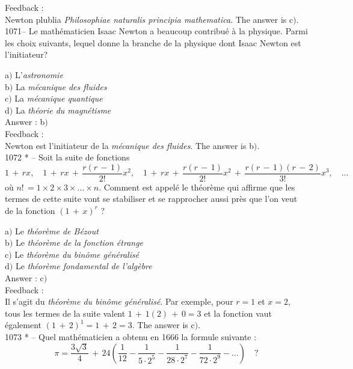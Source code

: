 \documentclass[letterpaper, 12pt]{article}
\begin{document}
Feedback : \\
Newton plublia {\sl Philosophiae naturalis principia mathematica}.
The answer is c$)$.\\

1071-- Le math\'ematicien Isaac Newton a beaucoup contribu\'e \`a la
physique. Parmi les choix suivants, lequel donne la branche de la
physique dont Isaac Newton est l'initiateur?

a$)$ L'{\sl astronomie} \\
b$)$ La {\sl m\'ecanique des fluides}  \\
c$)$ La {\sl m\'ecanique quantique}  \\
d$)$ La {\sl th\'eorie du magn\'etisme}\\

Answer : b$)$\\

Feedback : \\
Newton est l'initiateur de la {\sl m\'ecanique des fluides}.
The answer is b$)$.\\

1072 * -- Soit la suite de fonctions
$$\displaystyle{1\,+\,rx,\quad 1\,+\,rx\,+\,\frac{r(r\,-\,1)}{2!}x^2,\quad
1\,+\,rx\,+\,\frac{r(r\,-\,1)}{2!}x^2\,+\,\frac{r(r\,-\,1)(r\,-\,2)}{3!}x^3,\quad
\ldots}$$
o\`u $n!\,=1\times2\times3\times\ldots\times n$. Comment est
appel\'e le th\'eor\`eme qui affirme que les termes de cette suite
vont se stabiliser et se rapprocher aussi pr\`es que l'on veut de la
fonction $(1\,+\,x)^r$ ?

a$)$ Le {\sl th\'eor\`eme de B\'ezout} \\
b$)$ Le {\sl th\'eor\`eme de la fonction \'etrange}  \\
c$)$ Le {\sl th\'eor\`eme du bin\^ome g\'en\'eralis\'e}  \\
d$)$ Le {\sl th\'eor\`eme fondamental de l'alg\`ebre}\\

Answer : c$)$\\

Feedback : \\
Il s'agit du {\sl th\'eor\`eme du bin\^ome g\'en\'eralis\'e}. Par
exemple, pour $r=1$ et $x=2$, tous les termes de la suite valent
$1\,+\,1(2)\,+\,0=3$ et la fonction vaut \'egalement
$(1\,+\,2)^1=1\,+\,2=3$.
The answer is c$)$.\\

1073 * -- Quel math\'ematicien a obtenu en 1666 la formule suivante
:
$$\displaystyle{\pi=\frac{3\sqrt3}4\,+\,24\left(\frac1{12}-\frac1{5\cdot2^5}-\frac1{28\cdot2^7}-\frac1{72\cdot2^9}-\ldots\right)}\quad?$$
\end{document}

